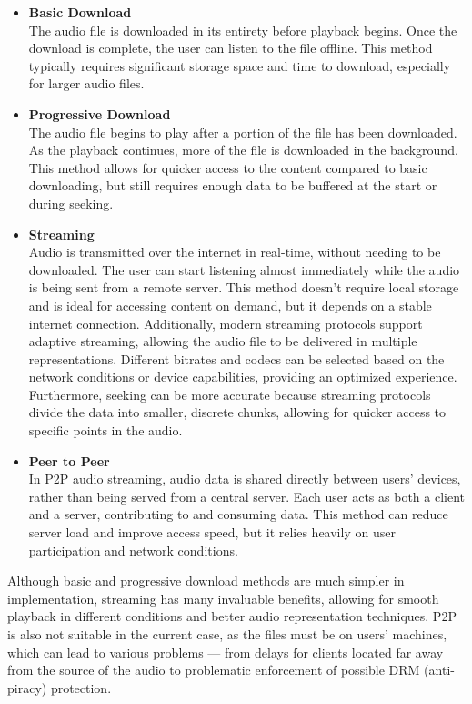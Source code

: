 \begin{itemize}
    \item \textbf{Basic Download}\\
    The audio file is downloaded in its entirety before playback begins.
    Once the download is complete, the user can listen to the file offline.
    This method typically requires significant storage space and time to download,
    especially for larger audio files.

    \item \textbf{Progressive Download}\\
    The audio file begins to play after a portion of the file
    has been downloaded. As the playback continues, more of the file is downloaded
    in the background. This method allows for quicker access to the content
    compared to basic downloading, but still requires enough data to be buffered at the start or during seeking.

    \item \textbf{Streaming}\\
    Audio is transmitted over the internet in real-time, without needing
    to be downloaded. The user can start listening almost immediately while the audio is being
    sent from a remote server. This method doesn’t require local storage and is
    ideal for accessing content on demand, but it depends on a stable internet connection.
    Additionally, modern streaming protocols support adaptive streaming, allowing the audio file
    to be delivered in multiple representations. Different bitrates and codecs can be
    selected based on the network conditions or device capabilities, providing an optimized experience.
    Furthermore, seeking can be more accurate because streaming protocols divide the data into
    smaller, discrete chunks, allowing for quicker access to specific points in the audio.

    \item \textbf{Peer to Peer}\\
    In P2P audio streaming, audio data is shared directly between users'
    devices, rather than being served from a central server.
    Each user acts as both a client and a server, contributing to and consuming
    data. This method can reduce server load and improve access speed,
    but it relies heavily on user participation and network conditions.
\end{itemize}

Although basic and progressive download methods are much simpler in implementation,
streaming has many invaluable benefits, allowing for smooth playback in different
conditions and better audio representation techniques. P2P is also not suitable
in the current case, as the files must be on users' machines, which can lead
to various problems — from delays for clients located far away from the source of the audio
to problematic enforcement of possible DRM (anti-piracy) protection.


